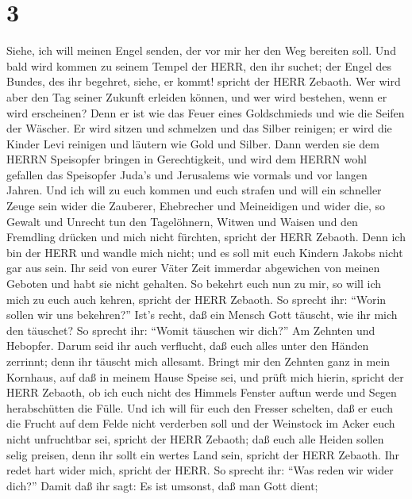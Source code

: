 \hypertarget{section-2}{%
\section{3}\label{section-2}}

 Siehe, ich will meinen Engel senden, der vor mir her den
Weg bereiten soll. Und bald wird kommen zu seinem Tempel der HERR, den
ihr suchet; der Engel des Bundes, des ihr begehret, siehe, er kommt!
spricht der HERR Zebaoth.  Wer wird aber den Tag seiner
Zukunft erleiden können, und wer wird bestehen, wenn er wird erscheinen?
Denn er ist wie das Feuer eines Goldschmieds und wie die Seifen der
Wäscher.  Er wird sitzen und schmelzen und das Silber
reinigen; er wird die Kinder Levi reinigen und läutern wie Gold und
Silber. Dann werden sie dem HERRN Speisopfer bringen in Gerechtigkeit,
 und wird dem HERRN wohl gefallen das Speisopfer Juda's und
Jerusalems wie vormals und vor langen Jahren.  Und ich will
zu euch kommen und euch strafen und will ein schneller Zeuge sein wider
die Zauberer, Ehebrecher und Meineidigen und wider die, so Gewalt und
Unrecht tun den Tagelöhnern, Witwen und Waisen und den Fremdling drücken
und mich nicht fürchten, spricht der HERR Zebaoth.  Denn ich
bin der HERR und wandle mich nicht; und es soll mit euch Kindern Jakobs
nicht gar aus sein.  Ihr seid von eurer Väter Zeit immerdar
abgewichen von meinen Geboten und habt sie nicht gehalten. So bekehrt
euch nun zu mir, so will ich mich zu euch auch kehren, spricht der HERR
Zebaoth. So sprecht ihr: ``Worin sollen wir uns bekehren?'' 
Ist's recht, daß ein Mensch Gott täuscht, wie ihr mich den täuschet? So
sprecht ihr: ``Womit täuschen wir dich?'' Am Zehnten und Hebopfer.
 Darum seid ihr auch verflucht, daß euch alles unter den
Händen zerrinnt; denn ihr täuscht mich allesamt.  Bringt
mir den Zehnten ganz in mein Kornhaus, auf daß in meinem Hause Speise
sei, und prüft mich hierin, spricht der HERR Zebaoth, ob ich euch nicht
des Himmels Fenster auftun werde und Segen herabschütten die Fülle.
 Und ich will für euch den Fresser schelten, daß er euch
die Frucht auf dem Felde nicht verderben soll und der Weinstock im Acker
euch nicht unfruchtbar sei, spricht der HERR Zebaoth;  daß
euch alle Heiden sollen selig preisen, denn ihr sollt ein wertes Land
sein, spricht der HERR Zebaoth.  Ihr redet hart wider mich,
spricht der HERR. So sprecht ihr: ``Was reden wir wider dich?''
 Damit daß ihr sagt: Es ist umsonst, daß man Gott dient;
